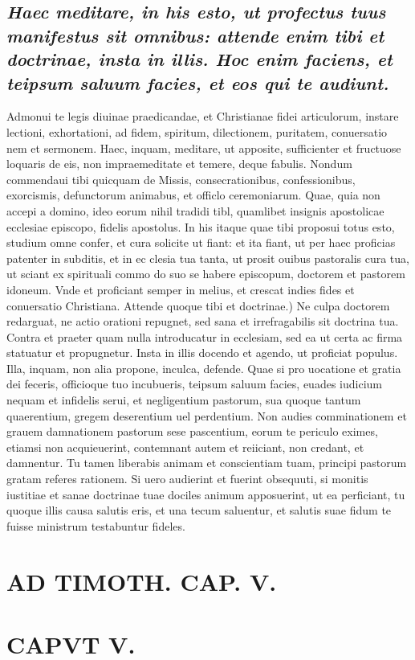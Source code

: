 \documentclass{article}
\begin{document}
\begin{pages}
\subsection*{\textit{Haec meditare, in his esto, ut profectus tuus manifestus sit omnibus: attende enim tibi et doctrinae, insta in illis. Hoc enim faciens, et teipsum saluum facies, et eos qui te audiunt. }}\pstart Admonui te legis diuinae praedicandae, et Christianae fidei articulorum, instare lectioni, exhortationi, ad fidem, spiritum, dilectionem, puritatem, conuersatio nem et sermonem. Haec, inquam, meditare, ut apposite, sufficienter et fructuose loquaris de eis, non impraemeditate et temere, deque fabulis. Nondum commendaui tibi quicquam de Missis, consecrationibus, confessionibus, exorcismis, defunctorum animabus, et officlo ceremoniarum. Quae, quia non accepi a domino, ideo eorum nihil tradidi tibl, quamlibet insignis apostolicae ecclesiae episcopo, fidelis apostolus. In his itaque quae tibi proposui totus esto, studium omne confer, et cura solicite ut fiant: et ita fiant, ut per haec proficias patenter in subditis, et in ec clesia tua tanta, ut prosit ouibus pastoralis cura tua, ut sciant ex spirituali commo do suo se habere episcopum, doctorem et pastorem idoneum. Vnde et proficiant semper in melius, et crescat indies fides et conuersatio Christiana. Attende quoque tibi et doctrinae.) Ne culpa doctorem redarguat, ne actio orationi repugnet, sed sana et irrefragabilis sit doctrina tua. Contra et praeter quam nulla introducatur in ecclesiam, sed ea ut certa ac firma statuatur et propugnetur. Insta in illis docendo et agendo, ut proficiat populus. Illa, inquam, non alia propone, inculca, defende. Quae si pro uocatione et gratia dei feceris, officioque tuo incubueris, teipsum saluum facies, euades iudicium nequam et infidelis serui, et negligentium pastorum, sua quoque tantum quaerentium, gregem deserentium uel perdentium. Non audies comminationem et grauem damnationem pastorum sese pascentium, eorum te periculo eximes, etiamsi non acquieuerint, contemnant autem et reiiciant, non credant, et damnentur. Tu tamen liberabis animam et conscientiam tuam, principi pastorum gratam referes rationem. Si uero audierint et fuerint obsequuti, si monitis iustitiae et sanae doctrinae tuae dociles animum apposuerint, ut ea perficiant, tu quoque illis causa salutis eris, et una tecum saluentur, et salutis suae fidum te fuisse ministrum testabuntur fideles.  \pend
\section*{AD TIMOTH. CAP. V. }
\marginpar{[ p.513 ]}
\endnumbering\beginnumbering\section{CAPVT V.}
{}

\end{pages}
\end{document}
